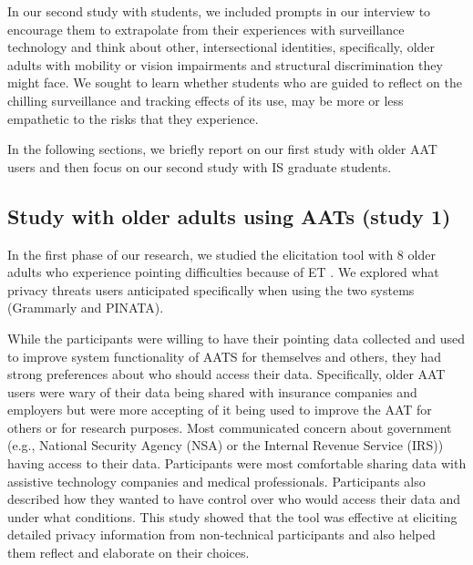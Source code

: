 \documentclass[11pt,dvipdfm]{article}
\begin{document}
In our second study with students, we included prompts in our interview to encourage them to extrapolate from their experiences with surveillance technology and think about other, intersectional identities, specifically, older adults with mobility or vision impairments and structural discrimination they might face. We sought to learn whether students who are guided to reflect on the chilling surveillance and tracking effects of its use, may be more or less empathetic to the risks that they experience. 

In the following sections, we briefly report on our first study with older AAT users and then focus on our second study with IS graduate students.

\subsection{Study with older adults using AATs (study 1)}
In the first phase of our research, we studied the elicitation tool with 8 older adults who experience pointing difficulties because of ET \cite{24}. We explored what privacy threats users anticipated specifically when using the two systems (Grammarly and PINATA). 

While the participants were willing to have their pointing data collected and used to improve system functionality of AATS for themselves and others, they had strong preferences about who should access their data. Specifically, older AAT users were wary of their data being shared with insurance companies and employers but were more accepting of it being used to improve the AAT for others or for research purposes. Most communicated concern about government (e.g., National Security Agency (NSA) or the Internal Revenue Service (IRS)) having access to their data. Participants were most comfortable sharing data with assistive technology companies and medical professionals. Participants also described how they wanted to have control over who would access their data and under what conditions. This study showed that the tool was effective at eliciting detailed privacy information from non-technical participants and also helped them reflect and elaborate on their choices.
\end{document}

